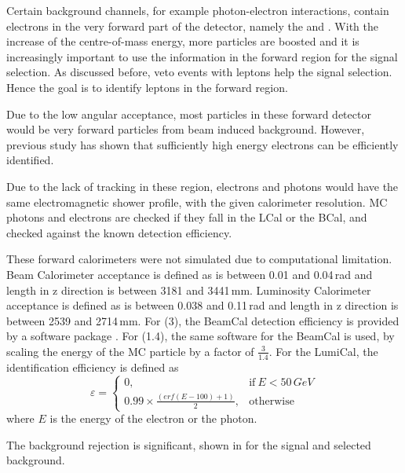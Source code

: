 Certain background channels, for example photon-electron interactions, contain electrons in the very forward part of the detector, namely the \LCAL and \BCAL. With the increase of the centre-of-mass energy, more particles are boosted and it is increasingly important to use the information in the forward region for the signal selection. As discussed before, veto events with leptons help the signal selection. Hence the goal is to identify leptons in the forward region.

Due to the low angular acceptance, most particles in these forward detector would be very forward particles from beam induced background. However, previous study \cite{sailer2012radiation} has shown that sufficiently high energy electrons can be efficiently identified.
 
 
 Due to the lack of tracking in these region, electrons and photons would have the same electromagnetic shower profile, with the given calorimeter resolution. MC photons and electrons are checked if they fall in the LCal or the BCal, and checked against the known detection efficiency.


These forward calorimeters were not simulated due to computational limitation. 
Beam Calorimeter acceptance is defined as \absCosTheta is between  0.01 and 0.04\,rad and length in z direction is between 3181 and 3441\,mm. Luminosity Calorimeter acceptance is defined as \absCosTheta is between  0.038 and 0.11\,rad and length in z direction is between 2539 and 2714\,mm. For \rootS(3), the BeamCal detection efficiency is provided by a software package \cite{}. For \rootS(1.4), the same software for the BeamCal is used, by scaling the energy of the MC particle by a factor of $\frac{3}{1.4}$. For the LumiCal, the identification efficiency is defined as
\begin{equation}
\varepsilon=
\begin{cases}
  0, & \text{if}\ E < 50\,GeV\\
  0.99 \times \frac{(erf(E - 100) + 1 )}{2}, & \text{otherwise}
\end{cases}
\end{equation}
where $E$ is the energy of the electron or the photon.

The background rejection is significant, shown in \Table{} for the signal and selected background.


